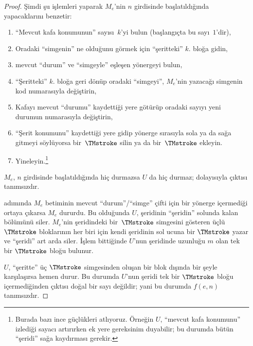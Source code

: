 \begin{proof}
  Şimdi şu işlemleri yaparak $M_e$'nin $n$ girdisinde başlatıldığında
  yapacaklarını benzetir:
  \begin{enumerate}
    \item ``Mevcut kafa konumunun'' sayısı~$k$'yi bulun (başlangıçta bu
    sayı~$1$'dir),
    \item Oradaki ``simgenin'' ne olduğunu görmek için ``şeritteki'' $k$.
    bloğa gidin,
    \item{}%
    mevcut ``durum'' ve ``simgeyle'' eşleşen yönergeyi bulun,
    \item ``Şeritteki'' $k$. bloğa geri dönüp oradaki ``simgeyi'', $M_e$'nin
    yazacağı simgenin kod numarasıyla değiştirin,
    \item Kafayı mevcut ``durumu'' kaydettiği yere götürüp oradaki sayıyı
    yeni durumun numarasıyla değiştirin,
    \item ``Şerit konumunu'' kaydettiği yere gidip yönerge sırasıyla sola ya
    da sağa gitmeyi söylüyorsa bir~$\TMstroke$ silin ya da
    bir~$\TMstroke$ ekleyin.
    \item Yineleyin.\footnote{Burada bazı ince güçlükleri atlıyoruz. Örneğin
    $U$, ``mevcut kafa konumunu'' izlediği sayacı artırırken ek yere gereksinim
    duyabilir; bu durumda bütün ``şeridi'' sağa kaydırması gerekir.}
  \end{enumerate}
  $M_e$, $n$ girdisinde başlatıldığında hiç durmazsa $U$ da hiç durmaz;
  dolayısıyla çıktısı tanımsızdır.

   adımında $M_e$ betiminin mevcut ``durum''/``simge'' çifti
  için bir yönerge içermediği ortaya çıkarsa $M_e$ dururdu. Bu olduğunda $U$,
  şeridinin ``şeridin'' solunda kalan bölümünü siler. $M_e$'nin şeridindeki
  bir~$\TMstroke$ simgesini gösteren üçlü $\TMstroke$ bloklarının her biri
  için kendi şeridinin sol ucuna bir $\TMstroke$ yazar ve ``şeridi'' art arda
  siler. İşlem bittiğinde $U$'nun şeridinde uzunluğu $m$ olan tek bir
  $\TMstroke$ bloğu bulunur.
  
  $U$, ``şeritte'' üç $\TMstroke$ simgesinden oluşan bir blok dışında bir
  şeyle karşılaşırsa hemen durur. Bu durumda $U$'nun şeridi tek bir
  $\TMstroke$ bloğu içermediğinden çıktısı doğal bir sayı değildir; yani bu
  durumda $f(e,n)$ tanımsızdır.
\end{proof}

